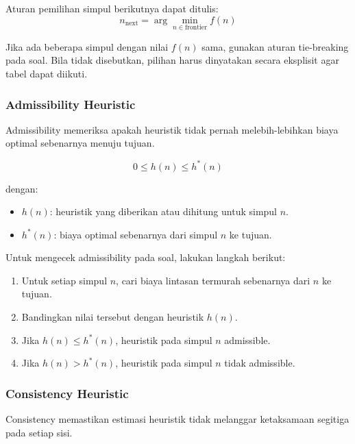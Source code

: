 Aturan pemilihan simpul berikutnya dapat ditulis:
\begin{equation}
    n_{\text{next}}=\arg\min_{n\in \text{frontier}} f(n)
    \label{eq:rp-next-node}
\end{equation}

Jika ada beberapa simpul dengan nilai $f(n)$ sama, gunakan aturan tie-breaking pada soal. Bila tidak disebutkan, pilihan harus dinyatakan secara eksplisit agar tabel dapat diikuti.

\subsubsection{Admissibility Heuristic}

\begin{jawab}
Admissibility memeriksa apakah heuristik tidak pernah melebih-lebihkan biaya optimal sebenarnya menuju tujuan.
\end{jawab}

\begin{equation}
    0 \le h(n) \le h^*(n)
    \label{eq:rp-admissible}
\end{equation}

dengan:
\begin{itemize}
    \item $h(n)$: heuristik yang diberikan atau dihitung untuk simpul $n$.
    \item $h^*(n)$: biaya optimal sebenarnya dari simpul $n$ ke tujuan.
\end{itemize}

Untuk mengecek admissibility pada soal, lakukan langkah berikut:
\begin{enumerate}
    \item Untuk setiap simpul $n$, cari biaya lintasan termurah sebenarnya dari $n$ ke tujuan.
    \item Bandingkan nilai tersebut dengan heuristik $h(n)$.
    \item Jika $h(n)\le h^*(n)$, heuristik pada simpul $n$ admissible.
    \item Jika $h(n)>h^*(n)$, heuristik pada simpul $n$ tidak admissible.
\end{enumerate}

\subsubsection{Consistency Heuristic}

\begin{jawab}
Consistency memastikan estimasi heuristik tidak melanggar ketaksamaan segitiga pada setiap sisi.
\end{jawab}

